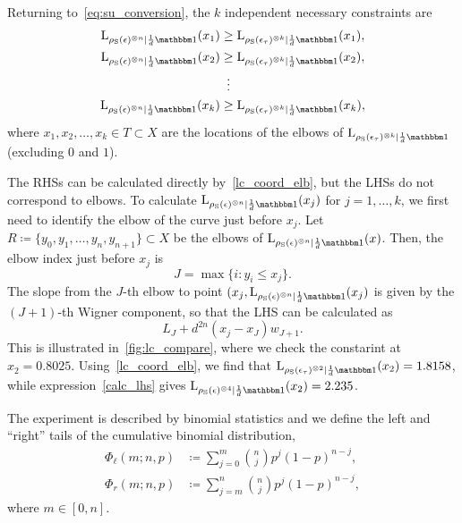 \documentclass[pra,
aps,
twocolumn,
superscriptaddress,
groupedaddress,
nofootinbib,
reprint
]{revtex4-1}
\begin{document}
Returning to~\ref{eq:su_conversion}, the $k$ independent necessary constraints are
\begin{align}
\lc{\noisysn}{\frac{1}{d}\id}(x_1) &\geq \lc{\rho_{\rm{S}}(\epsilon_{\tau})^{\otimes k}}{\frac{1}{d}\id}(x_1), \nonumber\\
\lc{\noisysn}{\frac{1}{d}\id}(x_2) &\geq \lc{\rho_{\rm{S}}(\epsilon_{\tau})^{\otimes k}}{\frac{1}{d}\id}(x_2), \nonumber\\
&\vdotswithin{=} \nonumber\\
\lc{\noisysn}{\frac{1}{d}\id}(x_k) &\geq \lc{\rho_{\rm{S}}(\epsilon_{\tau})^{\otimes k}}{\frac{1}{d}\id}(x_k), \nonumber
\end{align}
where $x_1, x_2, \dots, x_k \in T \subset X$ are the locations of the elbows of $\lc{\rho_{\rm{S}}(\epsilon_{\tau})^{\otimes k}}{\frac{1}{d}\id}$ (excluding $0$ and $1$).

The RHSs can be calculated directly by~\cref{lc_coord_elb}, but the LHSs do not correspond to elbows.
To calculate $\lc{\noisysn}{\frac{1}{d}\id}(x_j)$ for $j=1,\dots,k$, we first need to identify the elbow of the curve just before $x_j$.
Let $R \coloneqq \{y_0, y_1, \dots, y_n, y_{n+1}\} \subset X$ be the elbows of $\lc{\noisysn}{\frac{1}{d}\id}(x)$.
Then, the elbow index just before $x_j$ is
\begin{equation}
	J = \max{\{i: y_i \leq x_j \}}.
\end{equation}
The slope from the $J$-th elbow to point $(x_j, \lc{\noisysn}{\frac{1}{d}\id}(x_j)$ is given by the $(J+1)$-th Wigner component, so that the LHS can be calculated as 
\begin{equation}\label{calc_lhs}
	L_J + d^{2n}(x_j - x_J)w_{J+1}.
\end{equation}
This is illustrated in~\cref{fig:lc_compare}, where we check the constarint at $x_2 = 0.8025$.
Using~\cref{lc_coord_elb}, we find that $\lc{\rho_{\rm{S}}(\epsilon_\tau)^{\otimes 2}}{\frac{1}{d}\id}(x_2) = 1.8158$, while expression~\cref{calc_lhs} gives $\lc{\rho_{\rm{S}}(\epsilon)^{\otimes 4}}{\frac{1}{d}\id}(x_2) = 2.235$.


\null\newpage
\null\newpage

The experiment is described by binomial statistics and we define the left and ``right'' tails of the cumulative binomial distribution,
\begin{align}
	\Phi_\ell(m; n, p) &\coloneqq \sum\limits_{j=0}^m \binom{n}{j} p^j (1-p)^{n-j}, \label{eq:phi}\\
	\Phi_r(m; n, p) &\coloneqq \sum\limits_{j=m}^n \binom{n}{j} p^j (1-p)^{n-j}, \label{eq:phir}
\end{align}
where $m\in [0,n]$.
\end{document}
